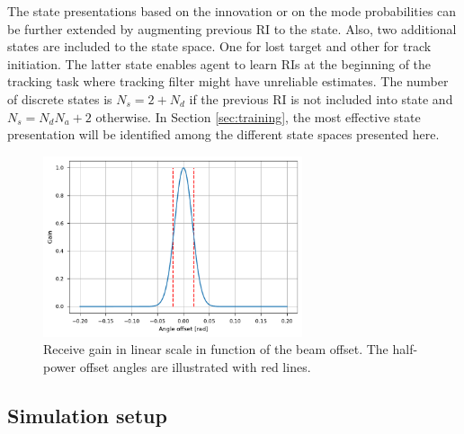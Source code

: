 \documentclass[english, 12pt, a4paper, elec, utf8, a-1b, online]{aaltothesis}
\begin{document}
The state presentations based on the innovation or on the mode probabilities can be further extended by augmenting previous RI to the state.
Also, two additional states are included to the state space. 
One for lost target and other for track initiation.
The latter state enables agent to learn RIs at the beginning of the tracking task where tracking filter might have unreliable estimates.
The number of discrete states is $N_s = 2+N_d$ if the previous RI is not included into state and $N_s = N_d N_a + 2$ otherwise.
In Section \ref{sec:training}, the most effective state presentation will be identified among the different state spaces presented here.


\begin{figure}[t]
    \centering
    \includegraphics[width=0.68\textwidth]{figures/benchmark/beamwidth.pdf}
    \caption{Receive gain in linear scale in function of the beam offset. 
    The half-power offset angles are illustrated with red lines.}
    \label{fig:beamwidth}
\end{figure}

\subsection{Simulation setup}\label{sec:ri_setup}

\newcommand{\sno}{SN_0}
\end{document}
